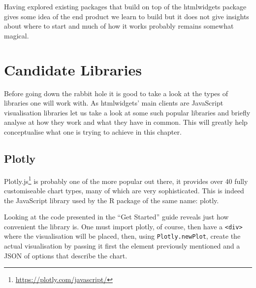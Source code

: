 \documentclass[
]{krantz}
\renewcommand{\href}[2]{#2\footnote{\url{#1}}}
\begin{document}
Having explored existing packages that build on top of the htmlwidgets package gives some idea of the end product we learn to build but it does not give insights about where to start and much of how it works probably remains somewhat magical.

\hypertarget{candidate-libraries}{%
\section{Candidate Libraries}\label{candidate-libraries}}

Before going down the rabbit hole it is good to take a look at the types of libraries one will work with. As htmlwidgets' main clients are JavaScript visualisation libraries let us take a look at some such popular libraries and briefly analyse at how they work and what they have in common. This will greatly help conceptualise what one is trying to achieve in this chapter.

\hypertarget{plotly}{%
\subsection{Plotly}\label{plotly}}

\href{https://plotly.com/javascript/}{Plotly.js} is probably one of the more popular out there, it provides over 40 fully customiseable chart types, many of which are very sophisticated. This is indeed the JavaScript library used by the R package of the same name: plotly.

Looking at the code presented in the ``Get Started'' guide reveals just how convenient the library is. One must import plotly, of course, then have a \texttt{\textless{}div\textgreater{}} where the visualisation will be placed, then, using \texttt{Plotly.newPlot}, create the actual visualisation by passing it first the element previously mentioned and a JSON of options that describe the chart.
\end{document}
